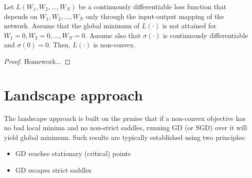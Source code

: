 \documentclass[12pt]{article}
\begin{document}
	\begin{proposition}
	\label{proposition:optimization in deep learning is non-convex, other assumptions}				
		Let $L(W_1,W_2,...,W_N)$ be a continuously differentiable loss function that depends on $W_1,W_2,...,W_N$ only through the input-output mapping of the network.
		Assume that the global minimum of $L(\cdot)$ is not attained for $W_1=0,W_2=0,...,W_N=0$.
		Assume also that $\sigma(\cdot)$ is continuously differentiable and $\sigma(0)=0$.
		Then, $L(\cdot)$ is non-convex.
	\end{proposition}
	\begin{proof}
	    Homework...
	\end{proof}
	\section{Landscape approach}
	The landscape approach is built on the prmise that if a non-convex objective has no bad local minima and no non-strict saddles, running GD (or SGD) over it will yield global minimum. Such results are typically established using two principles:
	\begin{itemize}
      \item GD reaches stationary (critical) points
      \item GD escapes strict saddles
    \end{itemize}
\end{document}
